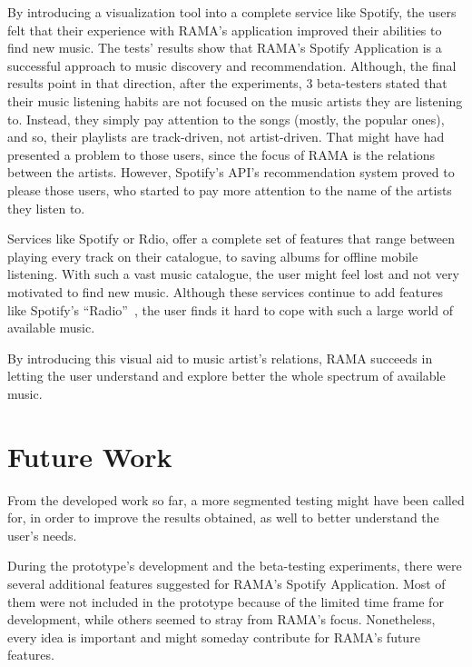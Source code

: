   By introducing a visualization tool into a complete service like Spotify, the users felt that their experience with RAMA's application improved their abilities to find new music.
  The tests' results show that RAMA's Spotify Application is a successful approach to music discovery and recommendation.
  Although, the final results point in that direction, after the experiments, 3 beta-testers stated that their music listening habits are not focused on the music artists they are listening to. Instead, they simply pay attention to the songs (mostly, the popular ones), and so, their playlists are track-driven, not artist-driven.
  That might have had presented a problem to those users, since the focus of RAMA is the relations between the artists.
  However, Spotify's API's recommendation system proved to please those users, who started to pay more attention to the name of the artists they listen to.

  Services like Spotify or Rdio, offer a complete set of features that range between playing every track on their catalogue, to saving albums for offline mobile listening.
  With such a vast music catalogue, the user might feel lost and not very motivated to find new music.
  Although these services continue to add features like Spotify's ``Radio''~\cite{spradio}, the user finds it hard to cope with such a large world of available music.

  By introducing this visual aid to music artist's relations, RAMA succeeds in letting the user understand and explore better the whole spectrum of available music.


\section{Future Work} %
\label{sec:future_work}

  From the developed work so far, a more segmented testing might have been called for, in order to improve the results obtained, as well to better understand the user's needs.

  During the prototype's development and the beta-testing experiments, there were several additional features suggested for RAMA's Spotify Application.
  Most of them were not included in the prototype because of the limited time frame for development, while others seemed to stray from RAMA's focus.
  Nonetheless, every idea is important and might someday contribute for RAMA's future features.

